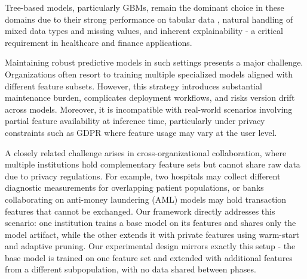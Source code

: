 \documentclass[sigconf]{acmart}
\begin{document}
Tree-based models, particularly GBMs, remain the dominant choice in these domains due to their strong performance on tabular data \cite{grinsztajn2022why,rana2023comparative,langenberger2023hcp}, natural handling of mixed data types and missing values, and inherent explainability - a critical requirement in healthcare and finance applications.

Maintaining robust predictive models in such settings presents a major challenge. Organizations often resort to training multiple specialized models aligned with different feature subsets. However, this strategy introduces substantial maintenance burden, complicates deployment workflows, and risks version drift across models. Moreover, it is incompatible with real-world scenarios involving partial feature availability at inference time, particularly under privacy constraints such as GDPR where feature usage may vary at the user level.

A closely related challenge arises in cross-organizational collaboration, where multiple institutions hold complementary feature sets but cannot share raw data due to privacy regulations. For example, two hospitals may collect different diagnostic measurements for overlapping patient populations, or banks collaborating on anti-money laundering (AML) models may hold transaction features that cannot be exchanged. Our framework directly addresses this scenario: one institution trains a base model on its features and shares only the model artifact, while the other extends it with private features using warm-start and adaptive pruning. Our experimental design mirrors exactly this setup - the base model is trained on one feature set and extended with additional features from a different subpopulation, with no data shared between phases.
\end{document}
